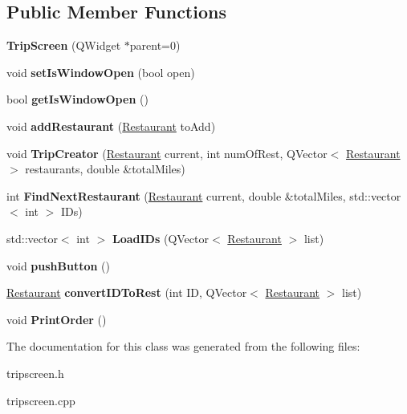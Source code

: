 \subsection*{Public Member Functions}
\begin{DoxyCompactItemize}
\item 
\mbox{\label{class_trip_screen_a5255c8d2e37c6f7c25de348327ec9a71}} 
{\bfseries Trip\+Screen} (Q\+Widget $\ast$parent=0)
\item 
\mbox{\label{class_trip_screen_a3eef4ff47f5688995cca879683ec5de3}} 
void {\bfseries set\+Is\+Window\+Open} (bool open)
\item 
\mbox{\label{class_trip_screen_a45812d1d598595225c392c6cf953690d}} 
bool {\bfseries get\+Is\+Window\+Open} ()
\item 
\mbox{\label{class_trip_screen_a8375220d50f17f1722f225223146302b}} 
void {\bfseries add\+Restaurant} (\hyperlink{class_restaurant}{Restaurant} to\+Add)
\item 
\mbox{\label{class_trip_screen_aca922b35bd83b51faa6bef7b96f05804}} 
void {\bfseries Trip\+Creator} (\hyperlink{class_restaurant}{Restaurant} current, int num\+Of\+Rest, Q\+Vector$<$ \hyperlink{class_restaurant}{Restaurant} $>$ restaurants, double \&total\+Miles)
\item 
\mbox{\label{class_trip_screen_a61b3c5991e10294ea7de956ffcc36261}} 
int {\bfseries Find\+Next\+Restaurant} (\hyperlink{class_restaurant}{Restaurant} current, double \&total\+Miles, std\+::vector$<$ int $>$ I\+Ds)
\item 
\mbox{\label{class_trip_screen_a4908a18d119ddda8e05d5492a4244d61}} 
std\+::vector$<$ int $>$ {\bfseries Load\+I\+Ds} (Q\+Vector$<$ \hyperlink{class_restaurant}{Restaurant} $>$ list)
\item 
\mbox{\label{class_trip_screen_a40e9a4a42eab6f237a1c3ffaabe70e72}} 
void {\bfseries push\+Button} ()
\item 
\mbox{\label{class_trip_screen_a4bd10ca49117a4c40855ea1c7407c9b8}} 
\hyperlink{class_restaurant}{Restaurant} {\bfseries convert\+I\+D\+To\+Rest} (int ID, Q\+Vector$<$ \hyperlink{class_restaurant}{Restaurant} $>$ list)
\item 
\mbox{\label{class_trip_screen_ad37000ffd5921c8c177f42acec2da4ba}} 
void {\bfseries Print\+Order} ()
\end{DoxyCompactItemize}


The documentation for this class was generated from the following files\+:\begin{DoxyCompactItemize}
\item 
tripscreen.\+h\item 
tripscreen.\+cpp\end{DoxyCompactItemize}
